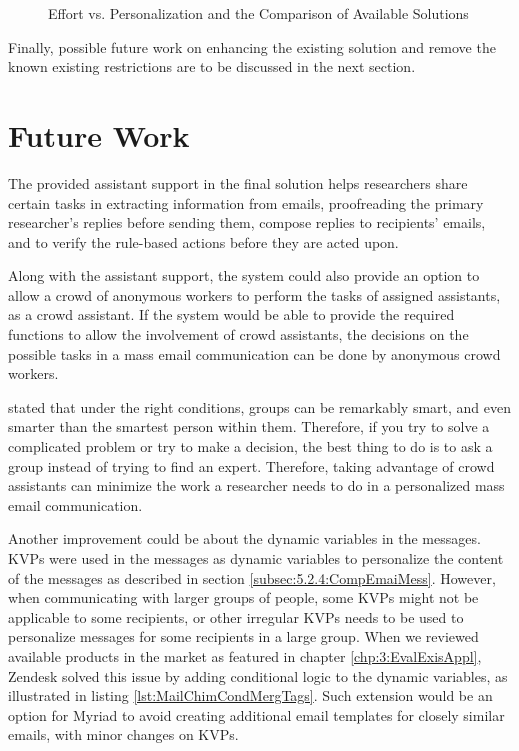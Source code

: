 \begin{figure}[htbp]
	\centering
	\begin{pdfpic}
	    
	\end{pdfpic}
	\caption[Effort vs. Personalization and the Comparison of Available Solutions]{Effort vs. Personalization and the Comparison of Available Solutions}
	\label{fig:drawingEfforPersonalizationAnnotations}
\end{figure}

Finally, possible future work on enhancing the existing solution and remove the known existing restrictions are to be discussed in the next section.

\section{Future Work}
\label{sec:6.2:FutuWork}

The provided assistant support in the final solution helps researchers share certain tasks in extracting information from emails, proofreading the primary researcher's replies before sending them, compose replies to recipients' emails, and to verify the rule-based actions before they are acted upon.
\vspace{1cm}

Along with the assistant support, the system could also provide an option to allow a crowd of anonymous workers to perform the tasks of assigned assistants, as a crowd assistant. If the system would be able to provide the required functions to allow the involvement of crowd assistants, the decisions on the possible tasks in a mass email communication can be done by anonymous crowd workers.
\vspace{1cm}

\cite{Surowiecki2005} stated that under the right conditions, groups can be remarkably smart, and even smarter than the smartest person within them. Therefore, if you try to solve a complicated problem or try to make a decision, the best thing to do is to ask a group instead of trying to find an expert. Therefore, taking advantage of crowd assistants can minimize the work a researcher needs to do in a personalized mass email communication.
\vspace{1cm}

Another improvement could be about the dynamic variables in the messages. \ac{KVP}s were used in the messages as dynamic variables to personalize the content of the messages as described in section \ref{subsec:5.2.4:CompEmaiMess}. However, when communicating with larger groups of people, some \ac{KVP}s might not be applicable to some recipients, or other irregular \ac{KVP}s needs to be used to personalize messages for some recipients in a large group. When we reviewed available products in the market as featured in chapter \ref{chp:3:EvalExisAppl}, Zendesk solved this issue by adding conditional logic to the dynamic variables, as illustrated in listing \ref{lst:MailChimCondMergTags}. Such extension would be an option for Myriad to avoid creating additional email templates for closely similar emails, with minor changes on \ac{KVP}s.
\vspace{1cm}

